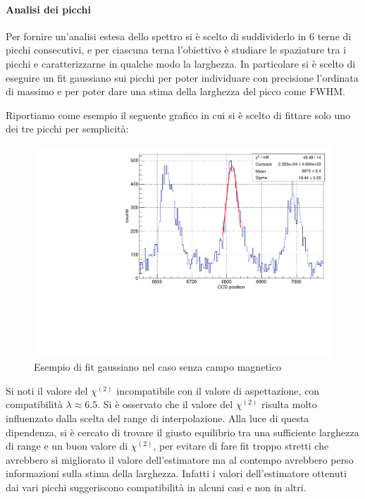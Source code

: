 \documentclass{article}
\begin{document}
	\paragraph{Analisi dei picchi}


	Per fornire un'analisi estesa dello spettro si è scelto di suddividerlo  in 6 terne di picchi consecutivi, e per ciascuna terna
	l'obiettivo è studiare le spaziature tra i picchi e caratterizzarne in
	qualche modo la larghezza. 
	In particolare si è scelto di eseguire un fit gaussiano sui picchi
	per poter individuare con precisione l'ordinata di massimo e per
	poter dare una stima della larghezza del picco come FWHM.
	
	Riportiamo come esempio il seguente grafico in cui si è scelto di fittare solo uno dei  tre picchi per semplicità:
	
	\begin{center}
		\begin{figure}[H]
			\centering
			\includegraphics[scale=0.38, angle=0]{campospento/singolo.pdf}
			\setlength{\belowcaptionskip}{-20pt}
			\caption{ Esempio di fit gaussiano nel caso senza campo magnetico}
			\label{fig:singoloBoff}
		\end{figure}
	\end{center}
	
	Si noti il valore del $\chi^{(2)}$ incompatibile con il valore di aspettazione, 
	con compatibilità $\lambda \approx 6.5$. Si è osservato che il valore del $\chi^{(2)}$
	risulta molto influenzato dalla scelta del range di interpolazione. Alla luce di questa
	dipendenza, si è cercato di trovare il giusto equilibrio tra una sufficiente
	larghezza di range e un buon valore di $\chi^{(2)}$, per evitare di fare fit troppo
	stretti che avrebbero sì migliorato il valore dell'estimatore ma al contempo avrebbero 
	perso informazioni sulla stima della larghezza.
	Infatti i valori dell'estimatore ottenuti dai vari picchi suggeriscono compatibilità 
	in alcuni casi e non in altri.
\end{document}
